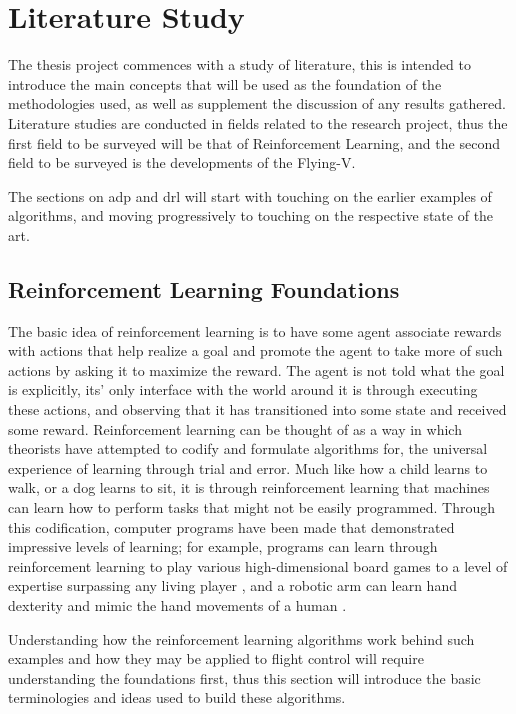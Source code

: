 \documentclass[../report.tex]{subfiles}
\begin{document}
\chapter{Literature Study}
\label{ch:literature_study}

\newfontfamily{}

The thesis project commences with a study of literature, this is intended to introduce the main concepts that will be used as the foundation of the methodologies used, as well as supplement the discussion of any results gathered. Literature studies are conducted in fields related to the research project, thus the first field to be surveyed will be that of Reinforcement Learning, and the second field to be surveyed is the developments of the Flying-V. 

The sections on adp and drl will start with touching on the earlier examples of algorithms, and moving progressively to touching on the respective state of the art.

\section{Reinforcement Learning Foundations}

The basic idea of reinforcement learning is to have some agent associate rewards with actions that help realize a goal and promote the agent to take more of such actions by asking it to maximize the reward. The agent is not told what the goal is explicitly, its' only interface with the world around it is through executing these actions, and observing that it has transitioned into some state and received some reward. Reinforcement learning can be thought of as a way in which theorists have attempted to codify and formulate algorithms for, the universal experience of learning through trial and error. Much like how a child learns to walk, or a dog learns to sit, it is through reinforcement learning that machines can learn how to perform tasks that might not be easily programmed. Through this codification, computer programs have been made that demonstrated impressive levels of learning; for example, programs can learn through reinforcement learning to play various high-dimensional board games to a level of expertise surpassing any living player \cite{alpha_zero}, and a robotic arm can learn hand dexterity and mimic the hand movements of a human \cite{OpenAI_dexterity}.

Understanding how the reinforcement learning algorithms work behind such examples and how they may be applied to flight control will require understanding the foundations first, thus this section will introduce the basic terminologies and ideas used to build these algorithms.
\end{document}
